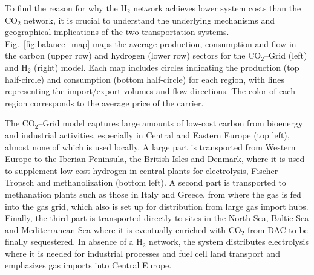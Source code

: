 \documentclass[twocolumn]{article}
\newcommand{\carbon}{CO$_2$}
\newcommand{\hydrogen}{H$_2$}
\newcommand{\carbongrid}{\carbon{}--Grid}
\newcommand{\hydrogengrid}{\hydrogen{}--Grid}
\begin{document}
To find the reason for why the \hydrogen{} network achieves lower system costs than the \carbon{} network, it is crucial to understand the underlying mechanisms and geographical implications of the two transportation systems. Fig.~\ref{fig:balance_map} maps the average production, consumption and flow in the carbon (upper row) and hydrogen (lower row) sectors for the \carbongrid{} (left) and \hydrogen{} (right) model. Each map includes circles indicating the production (top half-circle) and consumption (bottom half-circle) for each region, with lines representing the import/export volumes and flow directions. The color of each region corresponds to the average price of the carrier.


The \carbongrid{} model captures large amounts of low-cost carbon from bioenergy and industrial activities, especially in Central and Eastern Europe (top left), almost none of which is used locally. A large part is transported from Western Europe to the Iberian Peninsula, the British Isles and Denmark, where it is used to supplement low-cost hydrogen in central plants for electrolysis, Fischer-Tropsch and methanolization (bottom left). A second part is transported to methanation plants such as those in Italy and Greece, from where the gas is fed into the gas grid, which also is set up for distribution from large gas import hubs. Finally, the third part is transported directly to sites in the North Sea, Baltic Sea and Mediterranean Sea where it is eventually enriched with \carbon{} from DAC to be finally sequestered. In absence of a \hydrogen{} network, the system distributes electrolysis where it is needed for industrial processes and fuel cell land transport and emphasizes gas imports into Central Europe.
\end{document}
